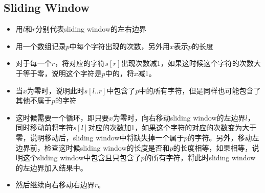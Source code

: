 \subsection{Sliding Window}
\begin{itemize}
\item 用$l$和$r$分别代表sliding window的左右边界
\item 用一个数组记录$p$中每个字符出现的次数，另外用$x$表示$p$的长度
\item 对于每一个$r$，将对应的字符$s[r]$出现次数减1，如果这时候这个字符的次数大于等于零，说明这个字符是$p$中的，将$x$减1。
\item 当$x$为零时，说明此时$s[l..r]$中包含了$p$中的所有字符，但是同样也可能包含了其他不属于$p$的字符
\item 这时候需要一个循环，即只要$x$为零时，向右移动sliding window的左边界$l$，同时移动前将字符$s[l]$对应的次数加1，如果这个字符的对应的次数变为大于零，说明移动后，sliding window中将缺失掉一个属于$p$的字符。另外，移动左边界前，检查这时候sliding window的长度是否和$p$的长度相等，如果相等，说明这个sliding window中包含且只包含了$p$的所有字符，将此时sliding window的左边界加入结果中。
\item 然后继续向右移动右边界$r$。
\end{itemize}

